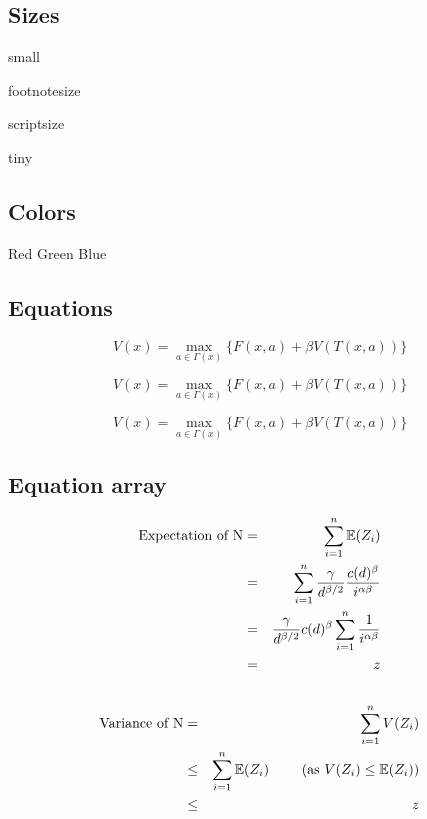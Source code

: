 \documentclass{article}
\begin{document}
\subsection{Sizes}\label{subsec:sizes}

\begin{small}
small
\end{small}

\begin{footnotesize}
footnotesize
\end{footnotesize}

\begin{scriptsize}
scriptsize
\end{scriptsize}

\begin{tiny}
tiny
\end{tiny}


\subsection{Colors}\label{subsec:colors}

{\color{red} Red}
{\color{green} Green}
{\color{blue} Blue}

\subsection{Equations}\label{subsec:eq}

$$
    V(x) = \max_{a \in \Gamma (x) } \{ F(x,a) + \beta V(T(x,a)) \}  \label{eq:bellman}
$$

\[
    V(x) = \max_{a \in \Gamma (x) } \{ F(x,a) + \beta V(T(x,a)) \}  \label{eq:bellman}
\]

\begin{equation}
    V(x) = \max_{a \in \Gamma (x) } \{ F(x,a) + \beta V(T(x,a)) \}  \label{eq:bellman}
\end{equation}


\subsection{Equation array}\label{subsec:eqarray}

\begin{eqnarray*}
    \mbox{Expectation of N} & = & \sum_{i=1}^{n} \mathbb{E}(Z_i) \\
                            & = & \sum_{i=1}^{n} \frac{\gamma}{d^{\beta/2}} \frac{ c(d)^\beta }{i^{\alpha\beta}} \\
                            & = & \frac{\gamma}{d^{\beta/2}} c(d)^\beta \sum_{i=1}^{n} \frac{1}{i^{\alpha\beta}} \\
                            & = & z \\
                            & ~ & \\
\end{eqnarray*}
\begin{eqnarray}
    \mbox{Variance of N} & = & \sum_{i=1}^{n} V(Z_i) \\
                         & \leq & \sum_{i=1}^{n} \mathbb{E}(Z_i) ~~~~~~~ (\mbox{as } V(Z_i) \leq \mathbb{E}(Z_i)) \\
                         & \leq & z  \nonumber
\end{eqnarray}
\end{document}
